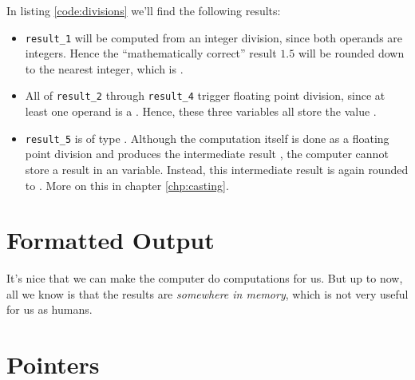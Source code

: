 In listing \ref{code:divisions} we'll find the following results:\vspace{-9pt}
\begin{itemize}
\setlength\itemsep{-6pt}
\item \texttt{result\_1} will be computed from an integer division, since both operands are integers. Hence the \enquote{mathematically correct} result $1.5$ will be rounded down to 
	the nearest integer, which is .
\item All of \texttt{result\_2} through \texttt{result\_4} trigger floating point division, since at least one operand is a . Hence, these three variables all store the 
	value .
\item \texttt{result\_5} is of type . Although the computation itself is done as a floating point division and produces the intermediate result , the computer cannot 
	store a  result in an  variable. Instead, this intermediate result is again rounded to . More on this in chapter \ref{chp:casting}.
\end{itemize}


\section{Formatted Output}
It's nice that we can make the computer do computations for us. But up to now, all we know is that the results are \emph{somewhere in memory}, which is not very useful for us as humans.


\section{Pointers}




